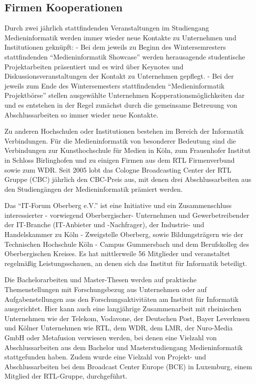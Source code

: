 \subsection{Firmen Kooperationen}\label{firmen-kooperationen}

Durch zwei jährlich stattfindenden Veranstaltungen im Studiengang
Medieninformatik werden immer wieder neue Kontakte zu Unternehmen und
Institutionen geknüpft: - Bei dem jeweils zu Beginn des Wintersemresters
stattfindenden ``Medieninformatik Showcase'' werden herausagende
studentische Projektarbeiten präsentiert und es wird über Keynotes und
Diskussionsveranstaltungen der Kontakt zu Unternehmen gepflegt. - Bei
der jeweils zum Ende des Wintersemesters stattfindenden
``Medieninformatik Projektbörse'' stellen ausgewählte Unternehmen
Kopperationsmöglichkeiten dar und es entstehen in der Regel zunächst
durch die gemeinsame Betreuung von Abschlussarbeiten so immer wieder
neue Kontakte.

Zu anderen Hochschulen oder Institutionen bestehen im Bereich der
Informatik Verbindungen. Für die Medieninformatik von besonderer
Bedeutung sind die Verbindungen zur Kunsthochschule für Medien in Köln,
zum Frauenhofer Institut in Schloss Birlinghofen und zu einigen Firmen
aus dem RTL Firmenverbund sowie zum WDR. Seit 2005 lobt das Cologne
Broadcasting Center der RTL Gruppe (CBC) jährlich den CBC-Preis aus, mit
denen drei Abschlussarbeiten aus den Studiengängen der Medieninformatik
prämiert werden.

Das ``IT-Forum Oberberg e.V.'' ist eine Initiative und ein
Zusammenschluss interessierter - vorwiegend Oberbergischer- Unternehmen
und Gewerbetreibender der IT-Branche (IT-Anbieter und -Nachfrager), der
Industrie- und Handelskammer zu Köln - Zweigstelle Oberberg, sowie
Bildungsträgern wie der Technischen Hochschule Köln - Campus Gummersbach
und dem Berufskolleg des Oberbergischen Kreises. Es hat mittlerweile 56
Mitglieder und veranstaltet regelmäßig Leistungsschauen, an denen sich
das Institut für Informatik beteiligt.

Die Bachelorarbeiten und Master-Thesen werden auf praktische
Themenstellungen mit Forschungsbezug aus Unternehmen oder auf
Aufgabenstellungen aus den Forschungsaktivitäten am Institut für
Informatik ausgerichtet. Hier kann auch eine langjährige Zusammenarbeit
mit rheinischen Unternehmen wie der Telekom, Vodavone, der Deutschen
Post, Bayer Leverkusen und Kölner Unternehmen wie RTL, dem WDR, dem LMR,
der Nuro-Media GmbH oder Metafusion verwiesen werden, bei denen eine
Vielzahl von Abschlussarbeiten aus dem Bachelor und Masterstudiengang
Medieninformatik stattgefunden haben. Zudem wurde eine Vielzahl von
Projekt- und Abschlussarbeiten bei dem Broadcast Center Europe (BCE) in
Luxemburg, einem Mitglied der RTL-Gruppe, durchgeführt.


